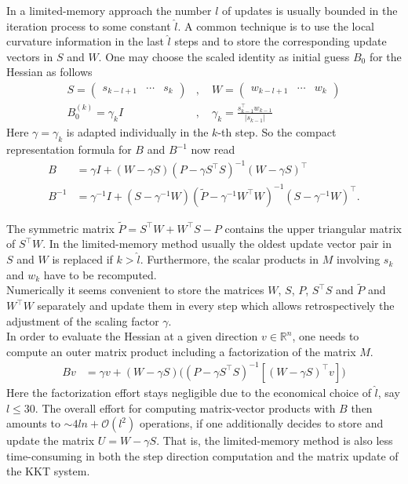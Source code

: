 \documentclass{svmult}
\begin{document}
In a limited-memory approach the number $l$ of updates is usually bounded in the iteration process to some constant $\hat{l}$. 
A common technique is to use the local curvature information in the last $\hat{l}$ steps and to store the corresponding update vectors in $S$ and $W$. 
One may choose the scaled identity as initial guess $B_0$ for the Hessian as follows
\begin{align*}
S = 
 			\begin{pmatrix}
 				s_{k-l+1} &   \cdots   & s_{k}
 			\end{pmatrix}&, 
 	\quad W =
			\begin{pmatrix}
 				w_{k-l+1} & \cdots  & w_{k}
 			\end{pmatrix}\\
	B_0^{(k)} = \gamma_k I &, \quad \gamma_k = \frac{s_{k-1}^\top w_{k-1}}{ \left| s_{k-1} \right| }
\end{align*}
Here $\gamma=\gamma_k$ is adapted individually in the $k$-th step. So the compact representation formula for $B$ and $B^{-1}$ now read
\begin{align*}
B &= \gamma I + (W - \gamma S)( P - \gamma S^\top S )^{-1}(W- \gamma S)^\top\\
B^{-1} &= \gamma^{-1} I + (S - \gamma^{-1} W)( \tilde{P} - \gamma^{-1} W^\top W )^{-1}(S- \gamma^{-1} W)^\top.
\end{align*}
 
The symmetric matrix $\tilde{P}=S^\top W + W^\top S - P$ contains the upper triangular matrix of $S^\top W$. In the limited-memory method usually the oldest update vector pair in $S$ and $W$ is replaced if $k>\hat{l}$. Furthermore, the scalar products in $M$ involving $s_k$ and $w_k$ have to be recomputed. \\

\noindent Numerically it seems convenient to store the matrices $W$, $S$, $P$, $S^\top S$ and $\tilde{P}$ and $W ^\top W$ separately and update them in every step which allows retrospectively the adjustment of the scaling factor $\gamma$.\\

\noindent In order to evaluate the Hessian at a given direction $v \in \mathbb{R}^n$, one needs to compute an outer matrix product including a factorization of the matrix $M$. 
%
\begin{align*}
Bv &= \gamma v + (W - \gamma S)\big( ( P - \gamma S^\top S )^{-1}[ (W- \gamma S)^\top v ] \big)
\end{align*}
%
Here the factorization effort stays negligible due to the economical choice of $\hat{l}$, say $l \leq 30$. The overall effort for computing matrix-vector products with $B$ then amounts to $\sim 4 ln + \mathcal O (l^2)$ operations, if one additionally decides to store and update the matrix $U=W- \gamma S$. That is, the limited-memory method is also less time-consuming in both the step direction computation and the matrix update of the KKT system.
\end{document}
